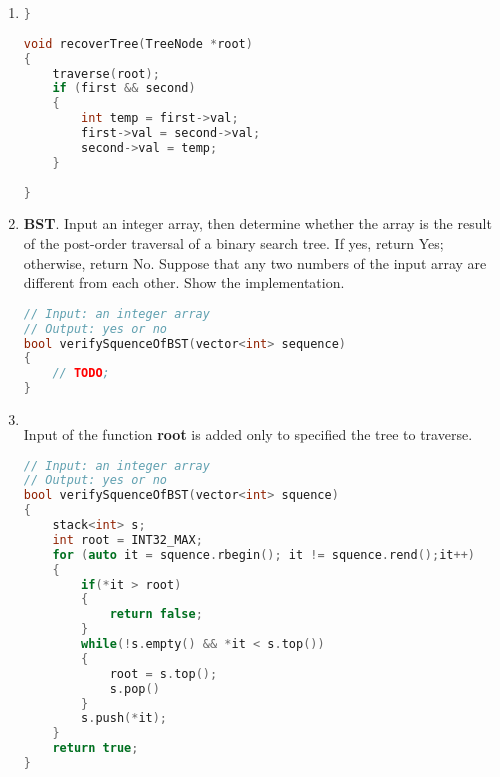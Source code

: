 \documentclass[12pt,a4paper]{article}
\makeatletter
\newtheorem*{solution}{Solution}
\theoremstyle{definition}
\renewenvironment{solution}[1][Solution] {\par\pushQED{\qed}\normalfont\topsep6\p@\@plus6\p@\relax\trivlist\item[\hskip\labelsep\bfseries#1\@addpunct{.}]\ignorespaces}{\popQED\endtrivlist\@endpefalse} \makeatother
\makeatother
\begin{document}
\begin{enumerate}
\begin{solution}
\begin{lstlisting}[language=C++]
}
 
void recoverTree(TreeNode *root)
{
	traverse(root);
    if (first && second)
    {
        int temp = first->val;
        first->val = second->val;
        second->val = temp;
    }
	
}

\end{lstlisting}
\end{solution}

\item  \textbf{BST}. Input an integer array, then determine whether the array is the result of the post-order traversal of a binary search tree. If yes, return Yes; otherwise, return No. Suppose that any two numbers of the input array are different from each other. Show the implementation.

\begin{lstlisting}[language=C++]
// Input: an integer array
// Output: yes or no
bool verifySquenceOfBST(vector<int> sequence)
{
	// TODO;
}
\end{lstlisting}

\begin{solution}
$\ $ \\
Input of the function \textbf{root} is added only to specified the tree to traverse.
\begin{lstlisting}[language=C++]
// Input: an integer array
// Output: yes or no
bool verifySquenceOfBST(vector<int> squence)
{
    stack<int> s;
    int root = INT32_MAX;
    for (auto it = squence.rbegin(); it != squence.rend();it++)
    {
        if(*it > root)
        {
            return false;
        }
        while(!s.empty() && *it < s.top())
        {
            root = s.top();
            s.pop()
        }
        s.push(*it);
    }
    return true;
}
\end{lstlisting}
\end{solution}

\end{enumerate}

\end{document}
